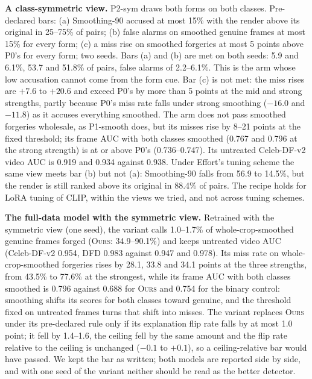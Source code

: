 \documentclass[conference]{IEEEtran}
\newcommand{\ours}{\textsc{Ours}}
\begin{document}
\textbf{A class-symmetric view.} P2-sym draws both forms on both classes. Pre-declared bars: (a) Smoothing-90 accused at most
15\% with the render above its original in 25--75\% of pairs; (b) false alarms on smoothed genuine frames at most 15\% for every
form; (c) a miss rise on smoothed forgeries at most 5 points above P0's for every form; two seeds. Bars (a) and (b) are met on
both seeds: 5.9 and 6.1\%, 53.7 and 51.8\% of pairs, false alarms of 2.2--6.1\%. This is the arm whose low accusation cannot come
from the form cue. Bar (c) is not met: the miss rises are $+7.6$ to $+20.6$ and exceed P0's by more than 5 points at the mid and
strong strengths, partly because P0's miss rate falls under strong smoothing ($-16.0$ and $-11.8$) as it accuses everything
smoothed. The arm does not pass smoothed forgeries wholesale, as P1-smooth does, but its misses rise by 8--21 points at the fixed
threshold; its frame AUC with both classes smoothed (0.767 and 0.796 at the strong strength) is at or above P0's (0.736--0.747).
Its untreated Celeb-DF-v2 video AUC is 0.919 and 0.934 against 0.938. Under Effort's tuning scheme the same view meets bar (b)
but not (a): Smoothing-90 falls from 56.9 to 14.5\%, but the render is still ranked above its original in 88.4\% of pairs. The
recipe holds for LoRA tuning of CLIP, within the views we tried, and not across tuning schemes.

\textbf{The full-data model with the symmetric view.} Retrained with the symmetric view (one seed), the variant calls 1.0--1.7\%
of whole-crop-smoothed genuine frames forged (\ours{}: 34.9--90.1\%) and keeps untreated video AUC (Celeb-DF-v2 0.954, DFD
0.983 against 0.947 and 0.978). Its miss rate on whole-crop-smoothed forgeries rises by 28.1, 33.8 and 34.1 points at the three
strengths, from 43.5\% to 77.6\% at the strongest, while its frame AUC with both classes smoothed is 0.796 against 0.688 for
\ours{} and 0.754 for the binary control: smoothing shifts its scores for both classes toward genuine, and the threshold fixed on
untreated frames turns that shift into misses. The variant replaces \ours{} under its pre-declared rule only if its explanation
flip rate falls by at most 1.0 point; it fell by 1.4--1.6, the ceiling fell by the same amount and the flip rate relative to the
ceiling is unchanged ($-0.1$ to $+0.1$), so a ceiling-relative bar would have passed. We kept the bar as written; both models are
reported side by side, and with one seed of the variant neither should be read as the better detector.
\end{document}
